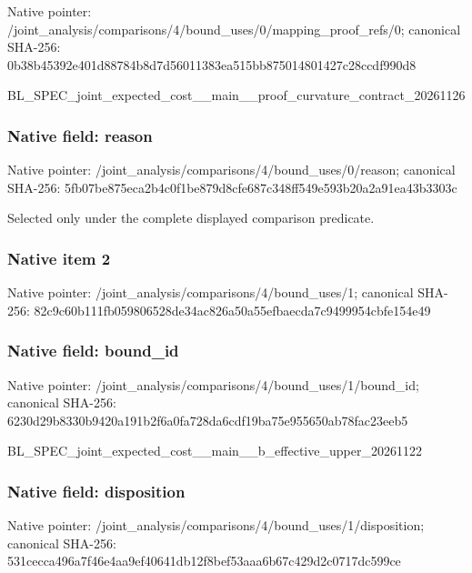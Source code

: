 \documentclass[10pt,a4paper]{article}
\begin{document}
Native pointer: /joint\_analysis/comparis\allowbreak{}ons/4/bound\_uses/0/mappi\allowbreak{}ng\_proof\_refs/0; canonical SHA-256: 0b38b45392e401d88784b8d7\allowbreak{}d56011383ea515bb87501480\allowbreak{}1427c28ccdf990d8


BL\_SPEC\_joint\_expected\_c\allowbreak{}ost\_\_main\_\_proof\_curvatu\allowbreak{}re\_contract\_20261126


\subsubsection{Native field: reason}


Native pointer: /joint\_analysis/comparis\allowbreak{}ons/4/bound\_uses/0/reaso\allowbreak{}n; canonical SHA-256: 5fb07be875eca2b4c0f1be87\allowbreak{}9d8cfe687c348ff549e593b2\allowbreak{}0a2a91ea43b3303c


Selected only under the complete displayed comparison predicate.


\subsubsection{Native item 2}


Native pointer: /joint\_analysis/comparis\allowbreak{}ons/4/bound\_uses/1; canonical SHA-256: 82c9c60b111fb059806528de\allowbreak{}34ac826a50a55efbaecda7c9\allowbreak{}499954cbfe154e49



\subsubsection{Native field: bound\_id}


Native pointer: /joint\_analysis/comparis\allowbreak{}ons/4/bound\_uses/1/bound\allowbreak{}\_id; canonical SHA-256: 6230d29b8330b9420a191b2f\allowbreak{}6a0fa728da6cdf19ba75e955\allowbreak{}650ab78fac23eeb5


BL\_SPEC\_joint\_expected\_c\allowbreak{}ost\_\_main\_\_b\_effective\_u\allowbreak{}pper\_20261122


\subsubsection{Native field: disposition}


Native pointer: /joint\_analysis/comparis\allowbreak{}ons/4/bound\_uses/1/dispo\allowbreak{}sition; canonical SHA-256: 531cecca496a7f46e4aa9ef4\allowbreak{}0641db12f8bef53aaa6b67c4\allowbreak{}29d2c0717dc599ce
\end{document}

